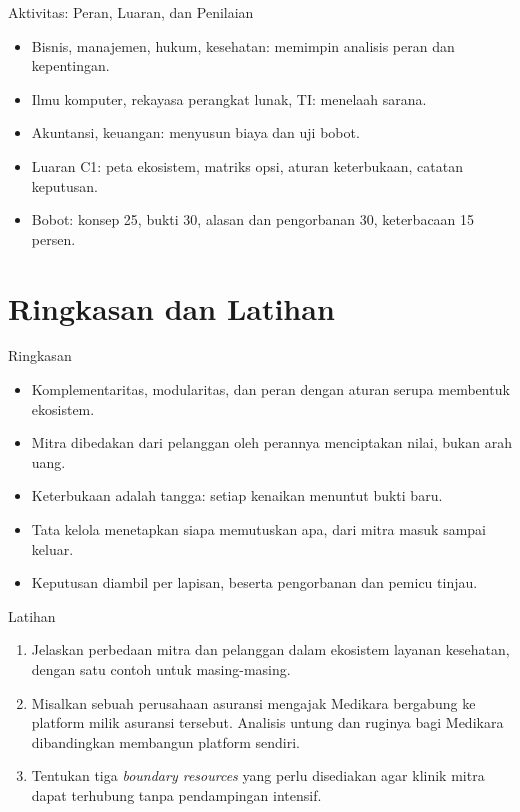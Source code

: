 \documentclass[aspectratio=169, table, 12pt]{beamer}
\begin{document}
\begin{frame}{{\Large Aktivitas: Peran, Luaran, dan Penilaian}}
  \vspace{6pt}
  \begin{itemize}
    \item Bisnis, manajemen, hukum, kesehatan: memimpin analisis peran dan kepentingan.
    \item Ilmu komputer, rekayasa perangkat lunak, TI: menelaah sarana.
    \item Akuntansi, keuangan: menyusun biaya dan uji bobot.
    \item Luaran C1: peta ekosistem, matriks opsi, aturan keterbukaan, catatan keputusan.
    \item Bobot: konsep 25, bukti 30, alasan dan pengorbanan 30, keterbacaan 15 persen.
  \end{itemize}
\end{frame}

\section{Ringkasan dan Latihan}

\begin{frame}{{\Large Ringkasan}}
  \vspace{10pt}
  \begin{itemize}
    \item Komplementaritas, modularitas, dan peran dengan aturan serupa membentuk ekosistem.
    \item Mitra dibedakan dari pelanggan oleh perannya menciptakan nilai, bukan arah uang.
    \item Keterbukaan adalah tangga: setiap kenaikan menuntut bukti baru.
    \item Tata kelola menetapkan siapa memutuskan apa, dari mitra masuk sampai keluar.
    \item Keputusan diambil per lapisan, beserta pengorbanan dan pemicu tinjau.
  \end{itemize}
\end{frame}

\begin{frame}{{\Large Latihan}}
  \vspace{10pt}
  \begin{enumerate}
    \item Jelaskan perbedaan mitra dan pelanggan dalam ekosistem layanan kesehatan, dengan satu contoh untuk
          masing-masing.
    \item Misalkan sebuah perusahaan asuransi mengajak Medikara bergabung ke platform milik asuransi tersebut.
          Analisis untung dan ruginya bagi Medikara dibandingkan membangun platform sendiri.
    \item Tentukan tiga \textit{boundary resources} yang perlu disediakan agar klinik mitra dapat terhubung tanpa
          pendampingan intensif.
  \end{enumerate}
\end{frame}
\end{document}
